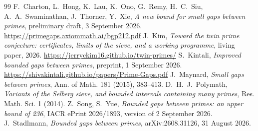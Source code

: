 \documentclass[11pt]{amsart}
\theoremstyle{definition}
\theoremstyle{remark}
\begin{document}
\begin{thebibliography}{99}
 F.~Charton, L.~Hong, K.~Lau, K.~Ono, G.~Remy, H.~C.~Siu,
A.~A.~Swaminathan, J.~Thorner, Y.~Xie, \emph{A new bound for small gaps
between primes}, preliminary draft, 3 September 2026.
\url{https://primegaps.axiommath.ai/bgp212.pdf}
 J.~Kim, \emph{Toward the twin prime conjecture: certificates,
limits of the sieve, and a working programme}, living paper, 2026.
\url{https://jerryckim16.github.io/twin-primes/}
 S.~Kintali, \emph{Improved bounded gaps between primes},
preprint, 1 September 2026.
\url{https://shivakintali.github.io/papers/Prime-Gaps.pdf}
 J.~Maynard, \emph{Small gaps between primes}, Ann. of Math.
181 (2015), 383--413.
 D.~H.~J.~Polymath, \emph{Variants of the Selberg sieve, and
bounded intervals containing many primes}, Res. Math. Sci. 1 (2014).
 Z.~Song, S.~Yue, \emph{Bounded gaps between primes: an upper
bound of 236}, IACR ePrint 2026/1893, version of 2 September 2026.
 J.~Stadlmann, \emph{Bounded gaps between primes},
arXiv:2608.31126, 31 August 2026.
\end{thebibliography}
\end{document}
